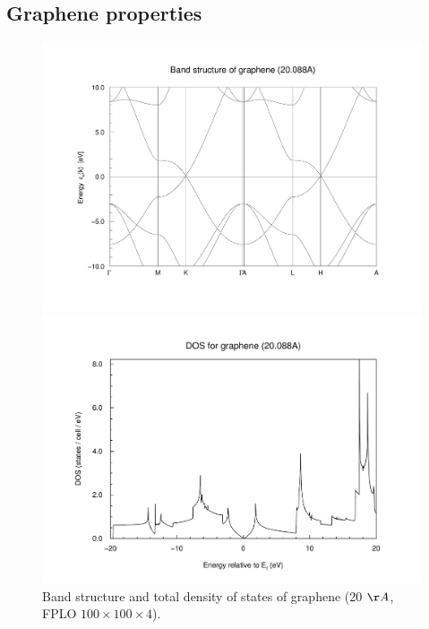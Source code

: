 			\subsection {Graphene properties}
				\begin{figure}
					\begin{minipage}[t]{\textwidth}
						\includegraphics[width=\textwidth]{Results/Graphene/Graphene20A/graphene20Aband.pdf}
					\end{minipage}
					\begin{minipage}[t]{\textwidth}
						\includegraphics[width=\textwidth]{Results/Graphene/Graphene20A/graphene20Ados.pdf}
					\end{minipage}
					\caption{Band structure and total density of states of graphene (20 $\AA$, FPLO $100\times100\times4$).}
					\label{fig:GrapheneProperties}
				\end{figure}
